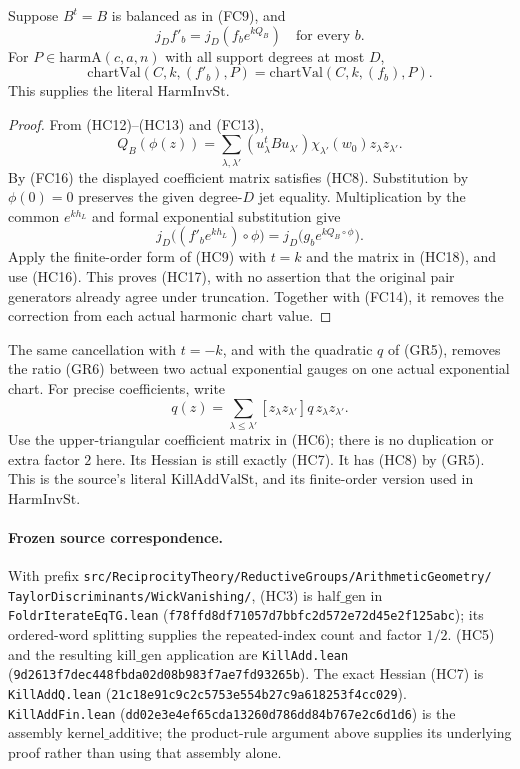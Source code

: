 \begin{srproposition}
\label{prop:sr-source-actual-harmonic-frame-correction}
Suppose \(B^t=B\) is balanced as in (FC9), and
\[
       j_Df'_b=j_D(f_b e^{kQ_B})\quad\text{for every }b.
\]
For \(P\in\mathrm{harmA}(c,a,n)\) with all support
degrees at most \(D\),
\[
             \mathrm{chartVal}(C,k,(f'_b),P)
                         =\mathrm{chartVal}(C,k,(f_b),P).
 \tag{HC17}
\]
This supplies the literal \(\mathrm{HarmInvSt}\).
\end{srproposition}
\begin{proof}
From (HC12)--(HC13) and (FC13),
\[
 Q_B(\phi(z))
   =\sum_{\lambda,\lambda'}
       \left(u_\lambda^tBu_{\lambda'}\right)
                \chi_{\lambda'}(w_0)z_\lambda z_{\lambda'}.
 \tag{HC18}
\]
By (FC16) the displayed coefficient matrix satisfies
(HC8).
Substitution by \(\phi(0)=0\) preserves the given
degree-\(D\) jet equality.
Multiplication by the common \(e^{kh_L}\) and formal
exponential substitution give
\[
 j_D\bigl((f'_be^{kh_L})\circ\phi\bigr)
        =j_D\bigl(g_b e^{kQ_B\circ\phi}\bigr).
\]
Apply the finite-order form of (HC9) with \(t=k\)
and the matrix in (HC18), and use (HC16).
This proves (HC17), with no assertion that the
original pair generators already agree under
truncation.
Together with (FC14), it removes the correction
from each actual harmonic chart value.
\end{proof}

The same cancellation with \(t=-k\), and with the
quadratic \(q\) of (GR5), removes the ratio (GR6)
between two actual exponential gauges on one actual
exponential chart.
For precise coefficients, write
\[
 q(z)=\sum_{\lambda\le\lambda'}
            [z_\lambda z_{\lambda'}]q\,
                                   z_\lambda z_{\lambda'}.
\]
Use the upper-triangular coefficient matrix in (HC6);
there is no duplication or extra factor \(2\) here.
Its Hessian is still exactly (HC7).
It has (HC8) by (GR5).
This is the source's literal
\(\mathrm{KillAddValSt}\), and its finite-order
version used in \(\mathrm{HarmInvSt}\).

\paragraph{Frozen source correspondence.}
With prefix
\texttt{src/ReciprocityTheory/ReductiveGroups/ArithmeticGeometry/}
\texttt{TaylorDiscriminants/WickVanishing/},
(HC3) is \(\mathrm{half\_gen}\) in
\texttt{FoldrIterateEqTG.lean}
(\texttt{f78ffd8df71057d7bbfc2d572e72d45e2f125abc});
its ordered-word splitting supplies the repeated-index
count and factor \(1/2\).
(HC5) and the resulting \(\mathrm{kill\_gen}\)
application are \texttt{KillAdd.lean}
(\texttt{9d2613f7dec448fbda02d08b983f7ae7fd93265b}).
The exact Hessian (HC7) is
\texttt{KillAddQ.lean}
(\texttt{21c18e91c9c2c5753e554b27c9a618253f4cc029}).
\texttt{KillAddFin.lean}
(\texttt{dd02e3e4ef65cda13260d786dd84b767e2c6d1d6})
is the assembly \(\mathrm{kernel\_additive}\);
the product-rule argument above supplies its underlying
proof rather than using that assembly alone.

